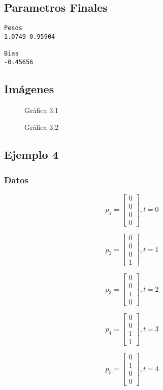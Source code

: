 \documentclass{article}
\begin{document}
\subsection{Parametros Finales}
\begin{lstlisting}
Pesos
1.0749 0.95904

Bias
-0.45656
\end{lstlisting}
\subsection{Imágenes}
\begin{figure}[htpb]
	\centering
	
	\caption{Gráfica 3.1}
\end{figure}

\begin{figure}[htpb]
	\centering
	
	\caption{Gráfica 3.2}
\end{figure}
\newpage
\subsection{Ejemplo 4}
\subsubsection{Datos}
\[p_1=
\begin{bmatrix}
0\\
0\\
0\\
0
\end{bmatrix}
,t = 0
\]

\[p_2=
\begin{bmatrix}
0\\
0\\
0\\
1
\end{bmatrix}
,t = 1
\]

\[p_3=
\begin{bmatrix}
0\\
0\\
1\\
0
\end{bmatrix}
,t = 2
\]

\[p_4=
\begin{bmatrix}
0\\
0\\
1\\
1
\end{bmatrix}
,t = 3
\]

\[p_5=
\begin{bmatrix}
0\\
1\\
0\\
0
\end{bmatrix}
,t = 4
\]
\end{document}
